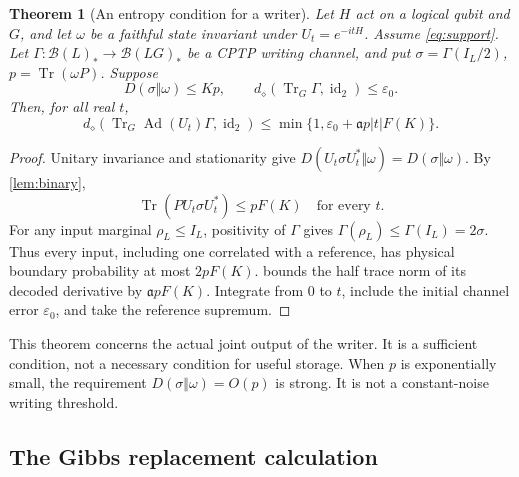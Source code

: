 \documentclass[11pt,reqno]{amsart}
\numberwithin{equation}{section}
\newtheorem{theorem}{Theorem}[section]
\theoremstyle{definition}
\theoremstyle{remark}
\newcommand{\Tr}{\operatorname{Tr}}
\newcommand{\id}{\operatorname{id}}
\newcommand{\Ad}{\operatorname{Ad}}
\newcommand{\Bcal}{\mathcal B}
\newcommand{\diam}{d_\diamond}
\newcommand{\pa}{\mathfrak a}
\begin{document}
\begin{theorem}[An entropy condition for a writer]\label{thm:entropy-writer}
Let \(H\) act on a logical qubit and \(G\), and let \(\omega\) be a faithful
state invariant under \(U_t=e^{-itH}\). Assume \eqref{eq:support}.
Let \(\Gamma:\Bcal(L)_*\to\Bcal(LG)_*\) be a CPTP writing channel,
and put \(\sigma=\Gamma(I_L/2)\), \(p=\Tr(\omega P)\).
Suppose
\[
 D(\sigma\Vert\omega)\le Kp,\qquad
 \diam(\Tr_G\Gamma,\id_2)\le\varepsilon_0.
\]
Then, for all real \(t\),
\begin{equation}\label{eq:entropy-writer}
 \diam(\Tr_G\Ad(U_t)\Gamma,\id_2)
       \le\min\{1,\varepsilon_0+\pa p|t|F(K)\}.
\end{equation}
\end{theorem}
\begin{proof}
Unitary invariance and stationarity give
\(D(U_t\sigma U_t^*\Vert\omega)=D(\sigma\Vert\omega)\).
By \cref{lem:binary},
\[
             \Tr(PU_t\sigma U_t^*)\le pF(K)
                       \quad\text{for every }t .
\]
For any input marginal \(\rho_L\le I_L\), positivity of \(\Gamma\) gives
\(\Gamma(\rho_L)\le\Gamma(I_L)=2\sigma\).
Thus every input, including one correlated with a reference, has
physical boundary probability at most \(2pF(K)\).
 bounds the half trace norm of its decoded derivative by
\(\pa pF(K)\). Integrate from \(0\) to \(t\), include the initial
channel error \(\varepsilon_0\), and take the reference supremum.
\end{proof}

This theorem concerns the actual joint output of the writer. It is a
sufficient condition, not a necessary condition for useful storage.
When \(p\) is exponentially small, the requirement \(D(\sigma\Vert\omega)=O(p)\)
is strong. It is not a constant-noise writing threshold.

\subsection{The Gibbs replacement calculation}
\end{document}
